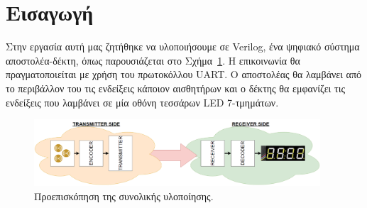 \documentclass[../main.tex]{subfiles}
\begin{document}
 
\section{Εισαγωγή}

Στην εργασία αυτή μας ζητήθηκε να υλοποιήσουμε σε Verilog, ένα ψηφιακό σύστημα
αποστολέα-δέκτη, όπως παρουσιάζεται στο Σχήμα~\ref{fig:complete_system}. Η
επικοινωνία θα πραγματοποιείται με χρήση του πρωτοκόλλου UART. Ο αποστολέας θα
λαμβάνει από το περιβάλλον του τις ενδείξεις κάποιον αισθητήρων και ο δέκτης θα
εμφανίζει τις ενδείξεις που λαμβάνει σε μία οθόνη τεσσάρων LED 7-τμημάτων.

\begin{figure}[H]
  \begin{center}
    \includegraphics[width=0.95\textwidth]{images/complete_system.png}
  \end{center}
  \caption{Προεπισκόπηση της συνολικής υλοποίησης.}
  \label{fig:complete_system}
\end{figure}
\end{document}
